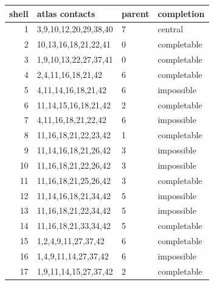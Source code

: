 \begin{tabular}{rlll}
\toprule
shell & atlas contacts & parent & completion \\
\midrule
1 & 3,9,10,12,20,29,38,40 & 7 & central \\
2 & 10,13,16,18,21,22,41 & 0 & completable \\
3 & 1,9,10,13,22,27,37,41 & 0 & completable \\
4 & 2,4,11,16,18,21,42 & 6 & completable \\
5 & 4,11,14,16,18,21,42 & 6 & impossible \\
6 & 11,14,15,16,18,21,42 & 2 & completable \\
7 & 4,11,16,18,21,22,42 & 6 & impossible \\
8 & 11,16,18,21,22,23,42 & 1 & completable \\
9 & 11,14,16,18,21,26,42 & 3 & impossible \\
10 & 11,16,18,21,22,26,42 & 3 & impossible \\
11 & 11,16,18,21,25,26,42 & 3 & completable \\
12 & 11,14,16,18,21,34,42 & 5 & impossible \\
13 & 11,16,18,21,22,34,42 & 5 & impossible \\
14 & 11,16,18,21,33,34,42 & 5 & completable \\
15 & 1,2,4,9,11,27,37,42 & 6 & completable \\
16 & 1,4,9,11,14,27,37,42 & 6 & impossible \\
17 & 1,9,11,14,15,27,37,42 & 2 & completable \\
\bottomrule
\end{tabular}
\par\smallskip
